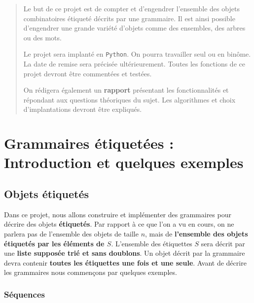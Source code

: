 \documentclass[11pt]{article}
\newcommand{\Python}{\texttt{Python}}
\begin{document}
\maketitle

\begin{abstract}
  Le but de ce projet est de compter et d'engendrer l'ensemble des objets
  combinatoires étiqueté décrits par une grammaire. Il est ainsi possible
  d'engendrer une grande variété d'objets comme des ensembles, des arbres ou
  des mots.  \smallskip

  Le projet sera implanté en \Python{}. On pourra travailler seul ou en
  binôme. La date de remise sera précisée ultérieurement. Toutes les fonctions
  de ce projet devront être commentées et testées.

  On rédigera également un \textbf{rapport} présentant les fonctionnalités et
  répondant aux questions théoriques du sujet. Les algorithmes et choix
  d'implantations devront être expliqués. 
\end{abstract}

\section{Grammaires étiquetées : Introduction et quelques exemples}

\subsection{Objets étiquetés}


Dans ce projet, nous allons construire et implémenter des grammaires pour
décrire des objets \textbf{étiquetés}. Par rapport à ce que l'on a vu en
cours, on ne parlera pas de l'ensemble des objets de taille $n$, mais de
\textbf{l'ensemble des objets étiquetés par les éléments de $S$}. L'ensemble
des étiquettes $S$ sera décrit par une \textbf{liste supposée trié et sans
  doublons}. Un objet décrit par la grammaire devra contenir \textbf{toutes
  les étiquettes une fois et une seule}. Avant de décrire les grammaires nous
commençons par quelques exemples.

\subsubsection{Séquences}
\label{seq:sequences}
\end{document}
